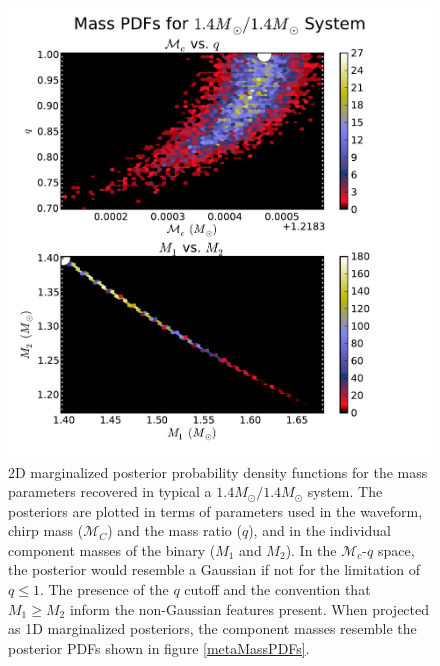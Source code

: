 \documentclass[11pt,a4paper]{emulateapj}
\newcommand{\chmass}{\mathcal{M}_c}
\begin{document}
\begin{figure}[h!]
  \centering
 \includegraphics[trim=0cm 0cm 2cm 0cm, clip=false,scale=0.56]{1414masses2D.pdf}
 \caption{2D marginalized posterior probability density functions for the mass parameters recovered in typical a $1.4M_{\odot}/1.4M_{\odot}$ system.  The posteriors are plotted in terms of parameters used in the waveform, chirp mass ($\mathcal{M}_C$) and the mass ratio ($q$), and in the individual component masses of the binary ($M_1$ and $M_2$).  In the $\chmass$-$q$ space, the posterior would resemble a Gaussian if not for the limitation of $q \leq 1$.  The presence of the $q$ cutoff and the convention that $M_1 \geq M_2$ inform the non-Gaussian features present.  When projected as 1D marginalized posteriors, the component masses resemble the posterior PDFs shown in figure \ref{metaMassPDFs}.}
  \label{1414masses}
\end{figure}
\end{document}
